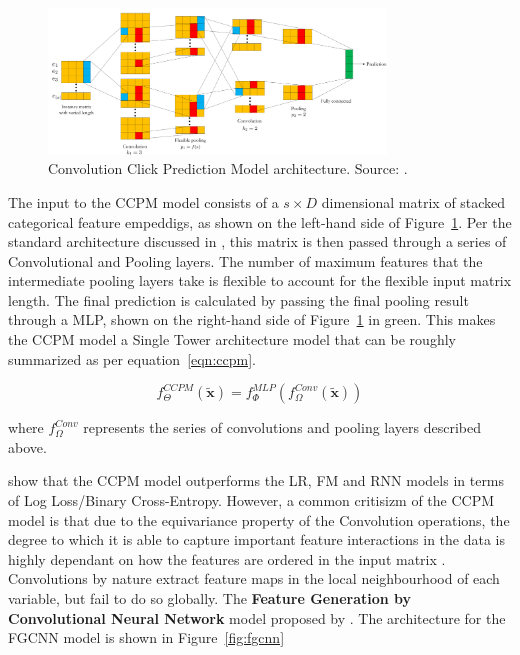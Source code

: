 \documentclass{mldsmsc}
\begin{document}
\begin{figure}[h]
    \centering
    \includegraphics[width=0.8\textwidth]{../figures/ccpm}
    \caption{Convolution Click Prediction Model architecture. Source: \citep{RefWorks:liu2015convolutional}.}
    \label{fig:ccpm}
\end{figure}

The input to the CCPM model consists of a $s \times D$ dimensional matrix of stacked categorical
feature empeddigs, as shown on the left-hand side of Figure~\ref{fig:ccpm}. Per the standard
architecture discussed in \citep{RefWorks:liu2015convolutional}, this matrix is then passed through
a series of Convolutional and Pooling layers. The number
of maximum features that the intermediate pooling layers take is flexible to account for the
flexible input matrix length. The final prediction is calculated by passing the final
pooling result through a MLP, shown on the right-hand side of Figure~\ref{fig:ccpm} in green.
This makes the CCPM model a Single Tower architecture model that can be roughly summarized
as per equation~\ref{eqn:ccpm}.

\begin{equation}\label{eqn:ccpm}
    f_{\Theta}^{CCPM}(\tilde{\mathbf{x}}) = f_{\Phi}^{MLP}(f_{\Omega}^{Conv}(\tilde{\mathbf{x}}))
\end{equation}

where $f_{\Omega}^{Conv}$ represents the series of convolutions and pooling layers described above.

\cite{RefWorks:liu2015convolutional} show that the CCPM model outperforms the LR, FM and RNN models
in terms of Log Loss/Binary Cross-Entropy. However, a common critisizm of the CCPM model is that
due to the equivariance property of the Convolution operations, the degree to which it is able to capture
important feature interactions in the data is highly dependant on how the features are ordered in the
input matrix \citep{RefWorks:zhang2021deep,RefWorks:qu2018product-based,RefWorks:gu2021ad}. Convolutions
by nature extract feature maps in the local neighbourhood of each variable, but fail to do so globally.
The \textbf{Feature Generation by Convolutional Neural Network} model proposed by \cite{RefWorks:liu2019feature}.
The architecture for the FGCNN model is shown in Figure~\ref{fig:fgcnn}
\end{document}
